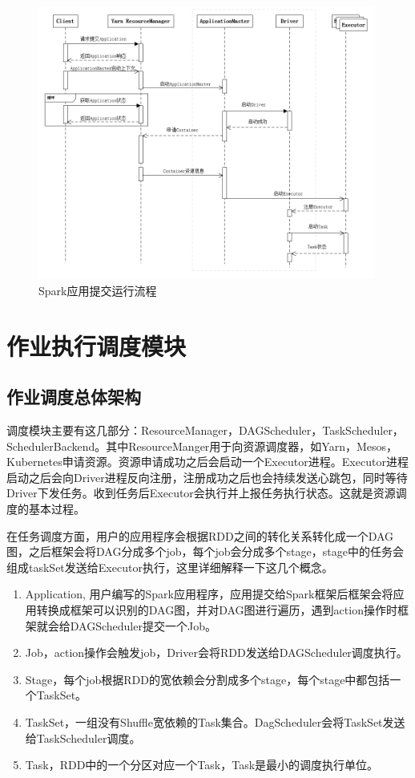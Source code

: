 \begin{figure}[htbp]
    \centering
    \includegraphics[width=0.99\textwidth]{Img/spark-submit-time.png}
    \caption{Spark应用提交运行流程}
    \label{fig:spark-submit-job}
\end{figure}


\section{作业执行调度模块}

\subsection{作业调度总体架构}
调度模块主要有这几部分：ResourceManager，DAGScheduler，TaskScheduler，SchedulerBackend。其中ResourceManger用于向资源调度器，如Yarn，Mesos，Kubernetes申请资源。资源申请成功之后会启动一个Executor进程。Executor进程启动之后会向Driver进程反向注册，注册成功之后也会持续发送心跳包，同时等待Driver下发任务。收到任务后Executor会执行并上报任务执行状态。这就是资源调度的基本过程。

在任务调度方面，用户的应用程序会根据RDD之间的转化关系转化成一个DAG图，之后框架会将DAG分成多个job，每个job会分成多个stage，stage中的任务会组成taskSet发送给Executor执行，这里详细解释一下这几个概念。

\begin{enumerate}
    \item Application, 用户编写的Spark应用程序，应用提交给Spark框架后框架会将应用转换成框架可以识别的DAG图，并对DAG图进行遍历，遇到action操作时框架就会给DAGScheduler提交一个Job。
    \item Job，action操作会触发job，Driver会将RDD发送给DAGScheduler调度执行。
    \item Stage，每个job根据RDD的宽依赖会分割成多个stage，每个stage中都包括一个TaskSet。
    \item TaskSet，一组没有Shuffle宽依赖的Task集合。DagScheduler会将TaskSet发送给TaskScheduler调度。
    \item Task，RDD中的一个分区对应一个Task，Task是最小的调度执行单位。
\end{enumerate}

